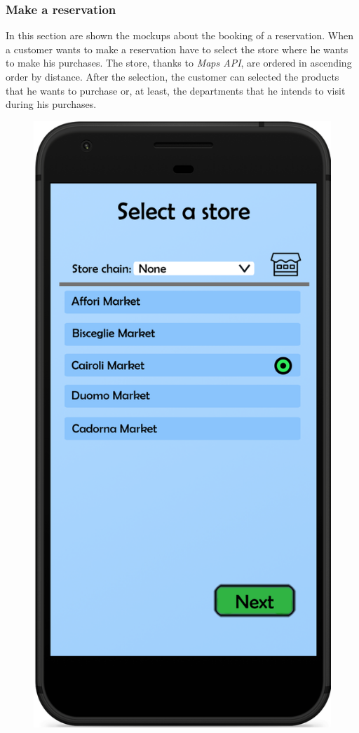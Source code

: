\documentclass{article}
\begin{document}
		\newpage 
		
		\subsubsection{Make a reservation}
		In this section are shown the mockups about the booking of a reservation. When a customer wants to make a reservation have to select the store where he wants to make his purchases. The store, thanks to \emph{Maps API}, are ordered in ascending order by distance. After the selection, the customer can selected the products that he wants to purchase or, at least, the departments that he intends to visit during his purchases.
		\bigskip
		\bigskip
		\begin{figure}[!h]
			\centering
			\begin{minipage}[!h]{0.4\textwidth}
				\includegraphics[width=\textwidth]{../Mockups/SelectStore.png}

\end{minipage}
\end{figure}
\end{document}
